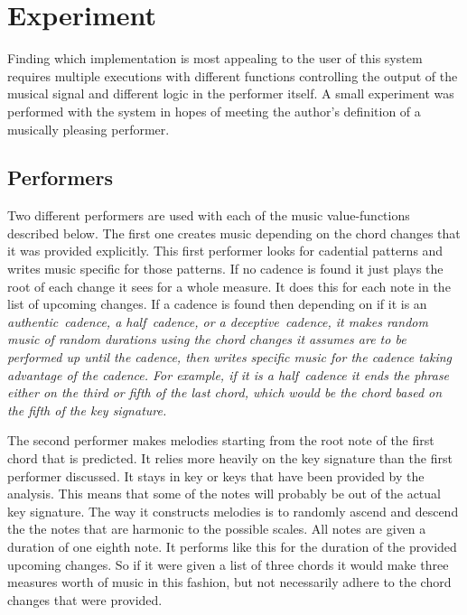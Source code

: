 \documentclass[12pt]{ucthesis}
\begin{document}
\chapter{Experiment}
\label {experiment}
Finding which implementation is most appealing to the user of this system requires multiple executions with different functions controlling the output of the musical signal and different logic in the performer itself. A small experiment was performed with the system in hopes of meeting the author's definition of a musically pleasing performer. 

\section{Performers}
\label {performers}

Two different performers are used with each of the music value-functions described below. The first one creates music depending on the chord changes that it was provided explicitly. This first performer looks for cadential patterns and writes music specific for those patterns. If no cadence is found it just plays the root of each change it sees for a whole measure. It does this for each note in the list of upcoming changes. If a cadence is found then depending on if it is an \em{authentic}~\em cadence, a \em{half}~\em cadence, or a \em{deceptive}~\em cadence, it makes random music of random durations using the chord changes it assumes are to be performed up until the cadence, then writes specific music for the cadence taking advantage of the cadence. For example, if it is a \em{half}~\em cadence it ends the phrase either on the third or fifth of the last chord, which would be the chord based on the fifth of the key signature.

The second performer makes melodies starting from the root note of the first chord that is predicted. It relies more heavily on the key signature than the first performer discussed. It stays in key or keys that have been provided by the analysis. This means that some of the notes will probably be out of the actual key signature. The way it constructs melodies is to randomly ascend and descend the the notes that are harmonic to the possible scales. All notes are given a duration of one eighth note. It performs like this for the duration of the provided upcoming changes. So if it were given a list of three chords it would make three measures worth of music in this fashion, but not necessarily adhere to the chord changes that were provided.
\end{document}
